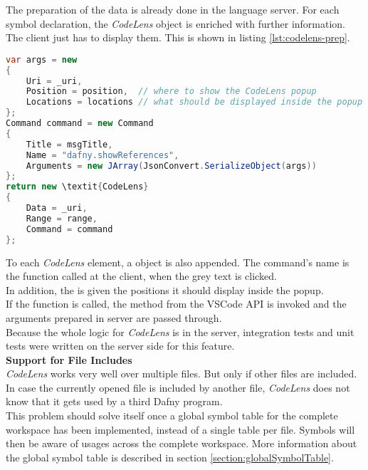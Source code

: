 The preparation of the data is already done in the language server.
For each symbol declaration, the \textit{CodeLens} object is enriched with further information.
The client just has to display them.
This is shown in listing \ref{lst:codelens-prep}.

\begin{lstlisting}[language=csharp, caption={LSP Handler Implementation}, captionpos=b, label={lst:codelens-prep}]
var args = new
{
    Uri = _uri,
    Position = position,  // where to show the CodeLens popup
    Locations = locations // what should be displayed inside the popup
};
Command command = new Command
{
    Title = msgTitle,
    Name = "dafny.showReferences",
    Arguments = new JArray(JsonConvert.SerializeObject(args))
};
return new \textit{CodeLens}
{
    Data = _uri,
    Range = range,
    Command = command
};
\end{lstlisting}

To each \textit{CodeLens} element, a  object is also appended.
The command's name is the function called at the client, when the grey text is clicked.\\

In addition, the  is given the positions it should display inside the popup.  \\

If the function  is called,
the method  from the VSCode API is invoked
and the arguments prepared in server are passed through. \\

Because the whole logic for \textit{CodeLens} is in the server,
integration tests and unit tests were written on the server side for this feature.\\

\textbf{Support for File Includes} \\
\textit{CodeLens} works very well over multiple files.
But only if other files are included.
In case the currently opened file is included by another file,
\textit{CodeLens} does not know that it gets used by a third Dafny program. \\

This problem should solve itself once a global symbol table for the complete workspace has been implemented,
instead of a single table per file.
Symbols will then be aware of usages across the complete workspace.
More information about the global symbol table is described in section \ref{section:globalSymbolTable}.

